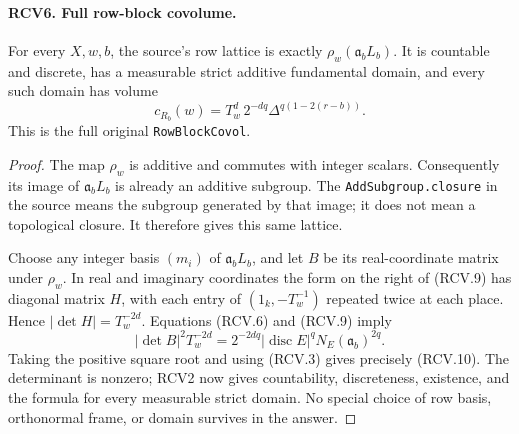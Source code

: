 \paragraph{RCV6. Full row-block covolume.}
\label{claim:RCV6}
For every \(X,w,b\), the source's row lattice is exactly
\(\rho_w(\mathfrak a_b L_b)\).  It is countable and discrete,
has a measurable strict additive fundamental domain, and every
such domain has volume
\[
 c_{R_b}(w)=T_w^d\,2^{-dq}
                \Delta^{q(1-2(r-b))}.
\tag{RCV.10}
\]
This is the full original \texttt{RowBlockCovol}.
\begin{proof}
The map \(\rho_w\) is additive and commutes with integer scalars.
Consequently its image of \(\mathfrak a_bL_b\) is already an
additive subgroup.  The \texttt{AddSubgroup.closure} in the source
means the subgroup generated by that image; it does not mean a
topological closure.  It therefore gives this same lattice.

Choose any integer basis \((m_i)\) of \(\mathfrak a_bL_b\),
and let \(B\) be its real-coordinate matrix under \(\rho_w\).
In real and imaginary coordinates the form on the right of (RCV.9)
has diagonal matrix \(H\), with each entry of
\((1_k,-T_w^{-1})\) repeated twice at each place.  Hence
\(|\det H|=T_w^{-2d}\).  Equations (RCV.6) and (RCV.9) imply
\[
 |\det B|^2 T_w^{-2d}
 =2^{-2dq}|\operatorname{disc}E|^q
                          N_E(\mathfrak a_b)^{2q}.
\]
Taking the positive square root and using (RCV.3) gives precisely
(RCV.10).  The determinant is nonzero; RCV2 now gives countability,
discreteness, existence, and the formula for every measurable
strict domain.  No special choice of row basis, orthonormal frame,
or domain survives in the answer.
\end{proof}

